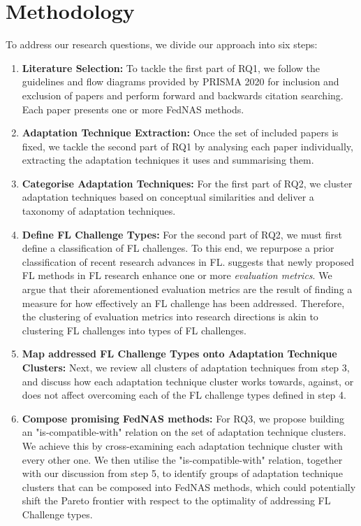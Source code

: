 \section{Methodology}

To address our research questions, we divide our approach into six steps:

\begin{enumerate}
    \item \textbf{Literature Selection:} To tackle the first part of RQ1, we follow the guidelines and flow diagrams provided by PRISMA 2020 \cite{prisma_2020} for inclusion and exclusion of papers and perform forward and backwards citation searching. Each paper presents one or more FedNAS methods. 
    \item \textbf{Adaptation Technique Extraction:} Once the set of included papers is fixed, we tackle the second part of RQ1 by analysing each paper individually, extracting the adaptation techniques it uses and summarising them.
    \item \textbf{Categorise Adaptation Techniques:} For the first part of RQ2, we cluster adaptation techniques based on conceptual similarities and deliver a taxonomy of adaptation techniques.
    \item \textbf{Define FL Challenge Types:} For the second part of RQ2, we must first define a classification of FL challenges. To this end, we repurpose a prior classification \cite{fl_taxonomy_2024} of recent research advances in FL. \cite{fl_taxonomy_2024} suggests that newly proposed FL methods in FL research enhance one or more \textit{evaluation metrics}. We argue that their aforementioned evaluation metrics are the result of finding a measure for how effectively an FL challenge has been addressed. Therefore, the clustering of evaluation metrics into research directions is akin to clustering FL challenges into types of FL challenges.
    \item \textbf{Map addressed FL Challenge Types onto Adaptation Technique Clusters:} Next, we review all clusters of adaptation techniques from step 3, and discuss how each adaptation technique cluster works towards, against, or does not affect overcoming each of the FL challenge types defined in step 4.
    \item \textbf{Compose promising FedNAS methods:} For RQ3, we propose building an "is-compatible-with" relation on the set of adaptation technique clusters. We achieve this by cross-examining each adaptation technique cluster with every other one. We then utilise the "is-compatible-with" relation, together with our discussion from step 5, to identify groups of adaptation technique clusters that can be composed into FedNAS methods, which could potentially shift the Pareto frontier with respect to the optimality of addressing FL Challenge types.
\end{enumerate}